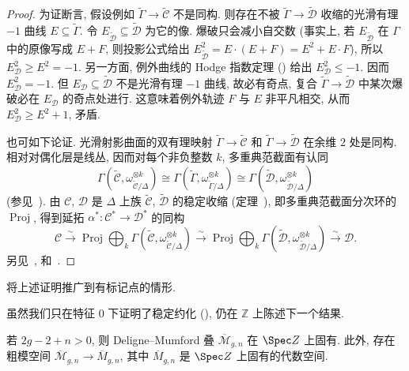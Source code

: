 \begin{proof}
为证断言, 假设例如 $\widetilde\Gamma\to\widetilde{\mathcal C}$ 不是同构. 则存在不被 $\widetilde\Gamma\to\widetilde{\mathcal D}$ 收缩的光滑有理 $-1$ 曲线 $E\subseteq\widetilde\Gamma$. 令 $E_{\widetilde{\mathcal D}}\subseteq\widetilde{\mathcal D}$ 为它的像. 爆破只会减小自交数 (事实上, 若 $E_{\widetilde{\mathcal D}}$ 在 $\Gamma$ 中的原像写成 $E+F$, 则投影公式给出 $E_{\widetilde{\mathcal D}}^2=E\cdot(E+F)=E^2+E\cdot F$), 所以 $E_{\mathcal D}^2\geq E^2=-1$. 另一方面, 例外曲线的 Hodge 指数定理 () 给出 $E_{\mathcal D}^2\leq-1$. 因而 $E_{\mathcal D}^2=-1$. 但 $E_{\mathcal D}\subseteq\widetilde{\mathcal D}$ 不是光滑有理 $-1$ 曲线, 故必有奇点, 复合 $\widetilde\Gamma\to\widetilde{\mathcal D}$ 中某次爆破必在 $E_{\mathcal D}$ 的奇点处进行. 这意味着例外轨迹 $F$ 与 $E$ 非平凡相交, 从而 $E_{\mathcal D}^2\geq E^2+1$, 矛盾.

也可如下论证. 光滑射影曲面的双有理映射 $\widetilde\Gamma\to\widetilde{\mathcal C}$ 和 $\widetilde\Gamma\to\widetilde{\mathcal D}$ 在余维 $2$ 处是同构. 相对对偶化层是线丛, 因而对每个非负整数 $k$, 多重典范截面有认同
\[
\Gamma(\widetilde{\mathcal C},\omega_{\widetilde{\mathcal C}/\Delta}^{\otimes k})
\cong\Gamma(\widetilde\Gamma,\omega_{\widetilde\Gamma/\Delta}^{\otimes k})
\cong\Gamma(\widetilde{\mathcal D},\omega_{\widetilde{\mathcal D}/\Delta}^{\otimes k})
\]
(参见~\cite[定理 II.8.19]{Har77}). 由 $\mathcal C$, $\mathcal D$ 是 $\Delta$ 上族 $\widetilde{\mathcal C}$, $\widetilde{\mathcal D}$ 的稳定收缩 (定理~), 即多重典范截面分次环的 $\operatorname{Proj}$, 得到延拓 $\alpha^*:\mathcal C^*\to\mathcal D^*$ 的同构
\[
\mathcal C\xrightarrow{\sim}\operatorname{Proj}\bigoplus_k\Gamma(\widetilde{\mathcal C},\omega_{\widetilde{\mathcal C}/\Delta}^{\otimes k})
\xrightarrow{\sim}\operatorname{Proj}\bigoplus_k\Gamma(\widetilde{\mathcal D},\omega_{\widetilde{\mathcal D}/\Delta}^{\otimes k})
\xrightarrow{\sim}\mathcal D.
\]
另见~\cite[引理 1.12]{DM69}, \cite[引理 10.5.1]{ACG11} 和~\cite[Tag 0E97]{SP}.
\end{proof}
\begin{exercise}[细节]\label{src:6.5.22}
将上述证明推广到有标记点的情形.
\end{exercise}
虽然我们只在特征 $0$ 下证明了稳定约化 (), 仍在 $\mathbb Z$ 上陈述下一个结果.
\begin{theorem}\label{src:6.5.23}
若 $2g-2+n>0$, 则 Deligne--Mumford 叠 $\overline{\mathcal M}_{g,\allowbreak n}$ 在 $\Spec\mathbb Z$ 上固有. 此外, 存在粗模空间 $\overline{\mathcal M}_{g,\allowbreak n}\to\overline M_{g,\allowbreak n}$, 其中 $\overline M_{g,\allowbreak n}$ 是 $\Spec\mathbb Z$ 上固有的代数空间.
\end{theorem}
